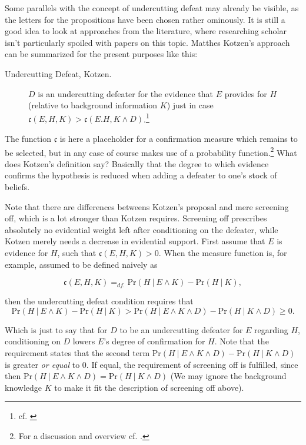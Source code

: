 \documentclass[11pt, a4paper]{scrartcl}
\newcommand{\given}[1][]{\:#1\vert\:}
\renewcommand{\Pr}{\text{Pr}}
\renewcommand{\i}[1]{\emph{#1}}
\begin{document}
Some parallels with the concept of undercutting defeat may already be visible, as the letters for the propositions have been chosen rather ominously. It is still a good idea to look at approaches from the literature, where researching scholar isn't particularly spoiled with papers on this topic. Matthes Kotzen's approach can be summarized for the present purposes like this:  
\begin{description}
    \item[Undercutting Defeat, Kotzen.]$D$ is an undercutting defeater for the evidence that $E$ provides for $H$ (relative to background information $K$) just in case \linebreak ${\mathfrak{c}(E, H, K) > \mathfrak{c}(E. H, K \land D)}$.\footnote{cf. \textcite[13]{Kotzen2010}}
\end{description}
The function $\mathfrak{c}$ is here a placeholder for a confirmation measure which remains to be selected, but in any case of course makes use of a probability function.\footnote{For a discussion and overview cf. \textcite{Fitelson}.} What does Kotzen's definition say? Basically that the degree to which evidence confirms the hypothesis is reduced when adding a defeater to one's stock of beliefs. 

Note that there are differences betweens Kotzen's proposal and mere screening off, which is a lot stronger than Kotzen requires. Screening off prescribes absolutely no evidential weight left after conditioning on the defeater, while Kotzen merely needs a decrease in evidential support. First assume that $E$ is evidence for $H$, such that $\mathfrak{c}(E,H,K) > 0$. When the measure function is, for example, assumed to be defined naively as 

\[\mathfrak{c}(E, H, K) =_{df.} \Pr(H \given E \land K) - \Pr(H \given K) ,\]

then the undercutting defeat condition requires that  
\begin{equation}\label{eq:undercut}
\Pr(H \given E \land K) - \Pr(H \given K)  >  \Pr(H \given E \land K \land D) - \Pr(H \given K \land D)  \geqslant 0.
\end{equation}

Which is just to say that for $D$ to be an undercutting defeater for $E$ regarding $H$, conditioning on $D$ lowers $E$'s degree of confirmation for $H$. Note that the requirement states that the second term $ \Pr(H \given E \land K \land D) - \Pr(H \given K \land D) $ is greater \i{or equal} to 0. If equal, the requirement of screening off is fulfilled, since then $\Pr(H \given E \land K \land D) = \Pr(H \given K \land D)$ (We may ignore the background knowledge $K$ to make it fit the description of screening off above).
\end{document}
